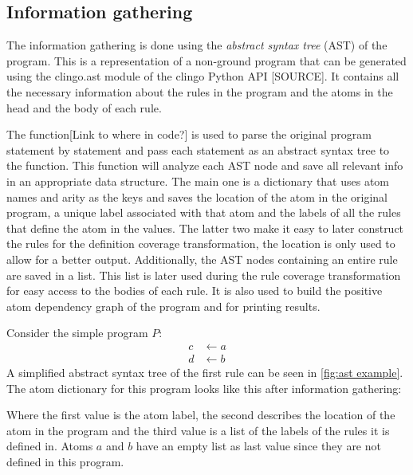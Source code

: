 \subsection{Information gathering}
\label{subsec:Computing coverage metrics for propositional programs/Implementation details/Information gathering}
The information gathering is done using the \emph{abstract syntax tree} (AST) of the program. This is a representation of a non-ground program that can be generated using the clingo.ast module of the clingo Python API [SOURCE]. It contains all the necessary information about the rules in the program and the atoms in the head and the body of each rule. 

The  function[Link to where in code?] is used to parse the original program statement by statement and pass each statement as an abstract syntax tree to the  function. This function will analyze each AST node and save all relevant info in an appropriate data structure. The main one is a dictionary that uses atom names and arity as the keys and saves the location of the atom in the original program, a unique label associated with that atom and the labels of all the rules that define the atom in the values. The latter two make it easy to later construct the rules for the definition coverage transformation, the location is only used to allow for a better output. Additionally, the AST nodes containing an entire rule are saved in a list. This list is later used during the rule coverage transformation for easy access to the bodies of each rule. It is also used to build the positive atom dependency graph of the program and for printing results.

\begin{example}
\label{ex:information gathering}
    Consider the simple program $P$:
    \begin{align*}
        c &\leftarrow a \\
        d &\leftarrow b
    \end{align*}
    A simplified abstract syntax tree of the first rule can be seen in \cref{fig:ast example}. The atom dictionary for this program looks like this after information gathering:
    

    Where the first value is the atom label, the second describes the location of the atom in the program and the third value is a list of the labels of the rules it is defined in. Atoms $a$ and $b$ have an empty list as last value since they are not defined in this program.
\end{example}

